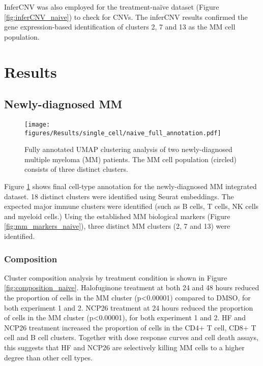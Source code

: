 InferCNV was also employed for the treatment-na\"ive dataset (Figure \ref{fig:inferCNV_naive}) to check for CNVs.
The inferCNV results confirmed the gene expression-based identification of clusters 2, 7 and 13 as the MM cell population.

\clearpage
\section{Results}

\subsection{Newly-diagnosed MM}


\begin{figure}[hpt]
\centering
\texttt{[image: figures/Results/single\_cell/naive\_full\_annotation.pdf]}
\caption[scRNA-seq full annotation- newly-diagnosed MM]{Fully annotated UMAP clustering analysis of two newly-diagnosed multiple myeloma (MM) patients.
The MM cell population (circled) consists of three distinct clusters.}
\label{fig:full_anno_naive}
\end{figure}

Figure \ref{fig:full_anno_naive} shows final cell-type annotation for the newly-diagnosed MM integrated dataset.
18 distinct clusters were identified using Seurat embeddings.
The expected major immune clusters were identified (such as B cells, T cells, NK cells and myeloid cells.)
Using the established MM biological markers (Figure \ref{fig:mm_markers_naive}), three distinct MM clusters (2, 7 and 13) were identified.

\subsubsection{Composition}
Cluster composition analysis by treatment condition is shown in Figure \ref{fig:composition_naive}.
Halofuginone treatment at both 24 and 48 hours reduced the proportion of cells in the MM cluster (p<0.00001) compared to DMSO, for both experiment 1 and 2.
NCP26 treatment at 24 hours reduced the proportion of cells in the MM cluster (p<0.00001), for both experiment 1 and 2.
HF and NCP26 treatment increased the proportion of cells in the CD4+ T cell, CD8+ T cell and B cell clusters.
Together with dose response curves and cell death assays, this suggests that HF and NCP26 are selectively killing MM cells to a higher degree than other cell types.

